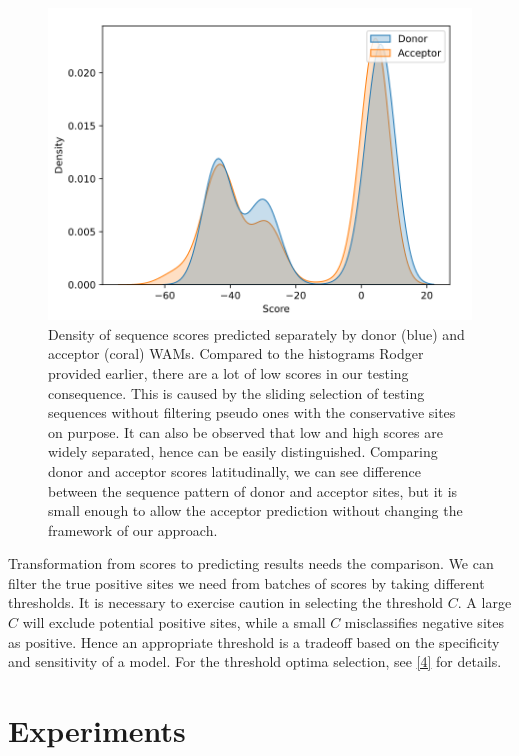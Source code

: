 \documentclass[journal,twoside]{IEEEtran}
\begin{document}
\begin{figure}[htbp]
\centerline{\includegraphics[scale=0.3]{Pics/density.png}}
\caption{Density of sequence scores predicted separately by donor (blue) and acceptor (coral) WAMs. Compared to the histograms Rodger \cite{staden1984computer} provided earlier, there are a lot of low scores in our testing consequence. This is caused by the sliding selection of testing sequences without filtering pseudo ones with the conservative sites on purpose. It can also be observed that low and high scores are widely separated, hence can be easily distinguished. Comparing donor and acceptor scores latitudinally, we can see difference between the sequence pattern of donor and acceptor sites, but it is small enough to allow the acceptor prediction without changing the framework of our approach. }
\label{fig4}
\end{figure}

Transformation from scores to predicting results needs the comparison. We can filter the true positive sites we need from batches of scores by taking different thresholds. It is necessary to exercise caution in selecting the threshold $C$. A large $C$ will exclude potential positive sites, while a small $C$ misclassifies negative sites as positive. Hence an appropriate threshold is a tradeoff based on the specificity and sensitivity of a model. For the threshold optima selection, see \ref{4} for details. 

\section{Experiments}\label{3}
\end{document}
